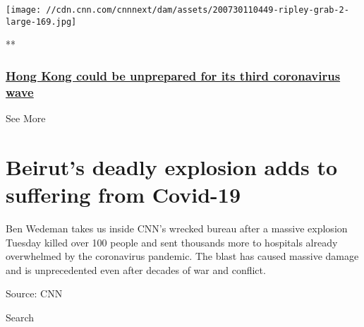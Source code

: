 \href{/videos/world/2020/07/30/hong-kong-third-wave-will-ripley-pkg-intl-ldn-vpx.cnn/video/playlists/coronavirus-intl/}{}

\texttt{[image: //cdn.cnn.com/cnnnext/dam/assets/200730110449-ripley-grab-2-large-169.jpg]}

**

\hypertarget{hong-kong-could-be-unprepared-for-its-third-coronavirus-wave}{%
\subsubsection{\texorpdfstring{\href{/videos/world/2020/07/30/hong-kong-third-wave-will-ripley-pkg-intl-ldn-vpx.cnn/video/playlists/coronavirus-intl/}{Hong
Kong could be unprepared for its third coronavirus
wave}}{Hong Kong could be unprepared for its third coronavirus wave}}\label{hong-kong-could-be-unprepared-for-its-third-coronavirus-wave}}

See More

\hypertarget{beiruts-deadly-explosion-adds-to-suffering-from-covid-19-2}{%
\section{Beirut's deadly explosion adds to suffering from
Covid-19}\label{beiruts-deadly-explosion-adds-to-suffering-from-covid-19-2}}

Ben Wedeman takes us inside CNN's wrecked bureau after a massive
explosion Tuesday killed over 100 people and sent thousands more to
hospitals already overwhelmed by the coronavirus pandemic. The blast has
caused massive damage and is unprecedented even after decades of war and
conflict.

Source: CNN

Search

